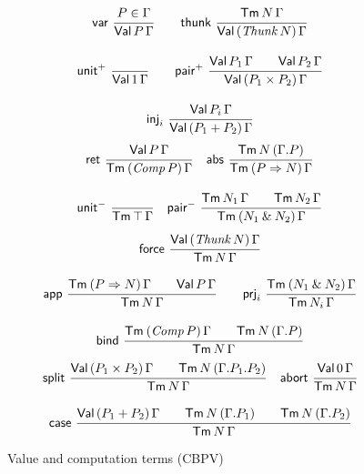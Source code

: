 \documentclass[sigplan,screen,fleqn,review]{acmart} %
\begin{document}
\begin{figure}[htbp]
\hrulefill
\begin{gather*}
  \nru{\tvar}{P \in \Gamma}{\PValT P \Gamma}
\qquad
  \nru{\tthunk}{\Tm N \Gamma}{\PValTP{\Thunk N}\Gamma}
\\[2ex]
  \nru{\punit}{}{\PValT{\tyone}\Gamma}
\qquad
  \nru{\ppair}
      {\PValT{P_1}\Gamma \qquad \PValT{P_2}\Gamma}
      {\PValTP{P_1 \times P_2}\Gamma}
\\[2ex]
  \nru{\tinj_i}{\PValT{P_i}\Gamma}{\PValTP{P_1 + P_2}\Gamma}
\end{gather*}
\dotfill
\begin{gather*}
  \nru{\tret}
      {\PValTm P \Gamma}
      {\TmP {\Comp P} \Gamma}
\quad
  \nru{\tabs}
      {\Tm N {(\cext \Gamma P)}}
      {\TmP {P \To N} \Gamma}
\\[2ex]
  \nru{\nunit}
      {}
      {\Tm \top \Gamma}
\quad
  \nru{\npair}
      {\Tm {N_1} \Gamma \qquad \Tm {N_2} \Gamma}
      {\TmP {N_1 \ntimes N_2} \Gamma}
\end{gather*}
\dotfill
\begin{gather*}
  \nru{\tforce}
      {\PValTmP {\Thunk N} \Gamma}
      {\Tm N \Gamma}
\\[2ex]
  \nru{\tapp}
      {\TmP {P \To N} \Gamma \qquad \PValTm P \Gamma}
      {\Tm N \Gamma}
\qquad
  \nru{\tprj_i}
      {\TmP {N_1 \ntimes N_2} \Gamma}
      {\Tm {N_i} \Gamma}
\\[2ex]
  \nru{\tbind}
      {\TmP {\Comp P} \Gamma \qquad \Tm N {(\cext \Gamma P)}}
      {\Tm N \Gamma}
\end{gather*}
\dotfill
\begin{gather*}
  \nru{\tsplit}
    {\PValTmP {P_1 \times P_2} \Gamma
      \qquad \Tm N {(\cext {\cext \Gamma P_1} P_2)}
    }{\Tm N \Gamma}
\quad
  \nru{\tabort}
    {\PValTm \tyzero \Gamma}
    {\Tm N \Gamma}
\\[2ex]
  \nru{\tcase}
    {\PValTmP {P_1 + P_2} \Gamma
      \qquad \Tm N {(\cext \Gamma P_1)}
      \qquad \Tm N {(\cext \Gamma P_2)}
    }{\Tm N \Gamma}
\end{gather*}
\hrulefill
  \caption{Value and computation terms (CBPV)}%
  \label{fig:tmcbpv}
\end{figure}
\end{document}
